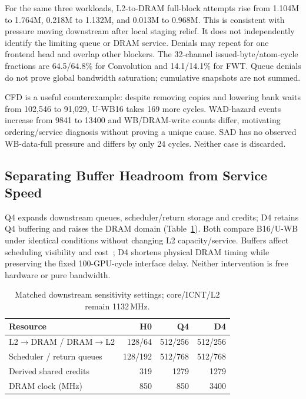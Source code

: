 \documentclass[conference,letterpaper]{IEEEtran}
\begin{document}
For the same three workloads, L2-to-DRAM full-block attempts rise from 1.104M to 1.764M, 0.218M to 1.132M, and 0.013M to 0.968M. This is consistent with pressure moving downstream after local staging relief. It does not independently identify the limiting queue or DRAM service. Denials may repeat for one frontend head and overlap other blockers. The 32-channel issued-byte/atom-cycle fractions are 64.5/64.8\% for Convolution and 14.1/14.1\% for FWT. Queue denials do not prove global bandwidth saturation; cumulative snapshots are not summed.

CFD is a useful counterexample: despite removing copies and lowering bank waits from 102,546 to 91,029, U-WB16 takes 169 more cycles. WAD-hazard events increase from 9841 to 13400 and WB/DRAM-write counts differ, motivating ordering/service diagnosis without proving a unique cause. SAD has no observed WB-data-full pressure and differs by only 24 cycles. Neither case is discarded.



\subsection{Separating Buffer Headroom from Service Speed}
Q4 expands downstream queues, scheduler/return storage and credits; D4 retains Q4 buffering and raises the DRAM domain (Table~\ref{tab:headroom}). Both compare B16/U-WB under identical conditions without changing L2 capacity/service. Buffers affect scheduling visibility and cost~\cite{sms}; D4 shortens physical DRAM timing while preserving the fixed 100-GPU-cycle interface delay. Neither intervention is free hardware or pure bandwidth.

\begin{table}[t]
\caption{Matched downstream sensitivity settings; core/ICNT/L2 remain 1132\,MHz.}
\label{tab:headroom}\centering\footnotesize
\begin{tabular}{@{}lrrr@{}}
\toprule
Resource & H0 & Q4 & D4 \\
\midrule
L2$\to$DRAM / DRAM$\to$L2 & 128/64 & 512/256 & 512/256 \\
Scheduler / return queues & 128/192 & 512/768 & 512/768 \\
Derived shared credits & 319 & 1279 & 1279 \\
DRAM clock (MHz) & 850 & 850 & 3400 \\
\bottomrule
\end{tabular}
\end{table}
\end{document}

